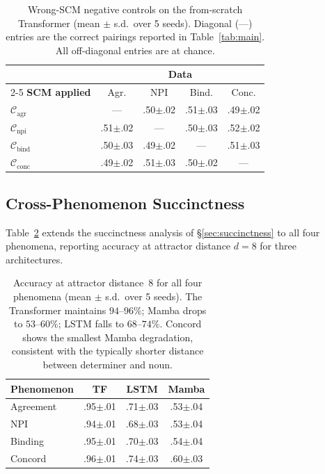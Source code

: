 \documentclass[11pt]{article}
\newcommand{\spm}[1]{{\scriptsize$\pm$#1}}
\begin{document}
\begin{table}[t]
\centering\small
\setlength{\tabcolsep}{2.5pt}
\begin{tabular}{@{}lcccc@{}}
\toprule
& \multicolumn{4}{c}{\textbf{Data}} \\
\cmidrule(lr){2-5}
\textbf{SCM applied} & Agr. & NPI & Bind. & Conc. \\
\midrule
$\mathcal{C}_\text{agr}$  & --- & .50\spm{.02} & .51\spm{.03} & .49\spm{.02} \\
$\mathcal{C}_\text{npi}$  & .51\spm{.02} & --- & .50\spm{.03} & .52\spm{.02} \\
$\mathcal{C}_\text{bind}$ & .50\spm{.03} & .49\spm{.02} & --- & .51\spm{.03} \\
$\mathcal{C}_\text{conc}$ & .49\spm{.02} & .51\spm{.03} & .50\spm{.02} & --- \\
\bottomrule
\end{tabular}
\caption{Wrong-SCM negative controls on the from-scratch Transformer (mean $\pm$ s.d.\ over 5 seeds). Diagonal (---) entries are the correct pairings reported in Table~\ref{tab:main}. All off-diagonal entries are at chance.}
\label{tab:negative-complete}
\end{table}

\subsection{Cross-Phenomenon Succinctness}
\label{app:succinctness-all}

Table~\ref{tab:succinctness-all} extends the succinctness analysis of \S\ref{sec:succinctness} to all four phenomena, reporting accuracy at attractor distance $d = 8$ for three architectures.

\begin{table}[t]
\centering\small
\begin{tabular}{@{}lccc@{}}
\toprule
\textbf{Phenomenon} & \textbf{TF} & \textbf{LSTM} & \textbf{Mamba} \\
\midrule
Agreement & .95\spm{.01} & .71\spm{.03} & .53\spm{.04} \\
NPI       & .94\spm{.01} & .68\spm{.03} & .53\spm{.04} \\
Binding   & .95\spm{.01} & .70\spm{.03} & .54\spm{.04} \\
Concord   & .96\spm{.01} & .74\spm{.03} & .60\spm{.03} \\
\bottomrule
\end{tabular}
\caption{Accuracy at attractor distance~$8$ for all four phenomena (mean $\pm$ s.d.\ over 5 seeds). The Transformer maintains $94$--$96\%$; Mamba drops to $53$--$60\%$; LSTM falls to $68$--$74\%$. Concord shows the smallest Mamba degradation, consistent with the typically shorter distance between determiner and noun.}
\label{tab:succinctness-all}
\end{table}
\end{document}
